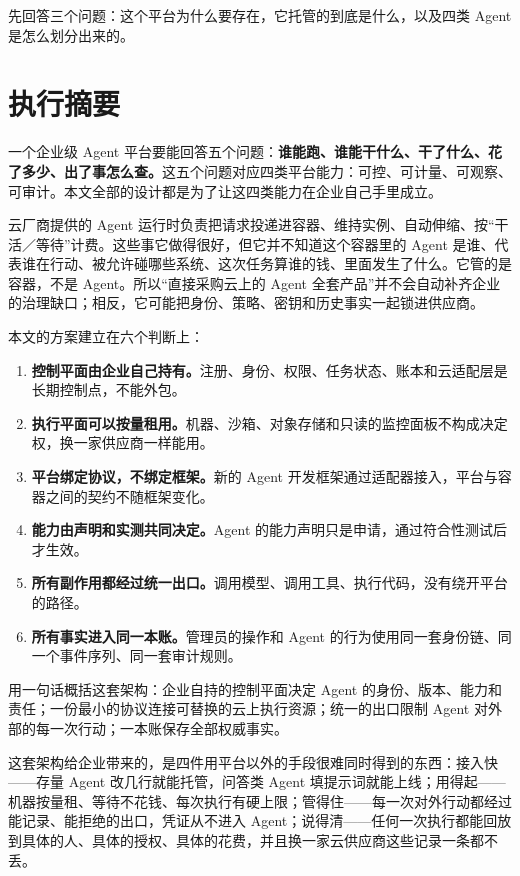 {先回答三个问题：这个平台为什么要存在，它托管的到底是什么，以及四类 Agent 是怎么划分出来的。}

\section{执行摘要}
\label{sec:exec}

一个企业级 Agent 平台要能回答五个问题：\textbf{谁能跑、谁能干什么、干了什么、花了多少、出了事怎么查。}这五个问题对应四类平台能力：可控、可计量、可观察、可审计。本文全部的设计都是为了让这四类能力在企业自己手里成立。

云厂商提供的 Agent 运行时负责把请求投递进容器、维持实例、自动伸缩、按“干活／等待”计费。这些事它做得很好，但它并不知道这个容器里的 Agent 是谁、代表谁在行动、被允许碰哪些系统、这次任务算谁的钱、里面发生了什么。它管的是容器，不是 Agent。所以“直接采购云上的 Agent 全套产品”并不会自动补齐企业的治理缺口；相反，它可能把身份、策略、密钥和历史事实一起锁进供应商。

本文的方案建立在六个判断上：

\begin{enumerate}
  \item \textbf{控制平面由企业自己持有。}注册、身份、权限、任务状态、账本和云适配层是长期控制点，不能外包。
  \item \textbf{执行平面可以按量租用。}机器、沙箱、对象存储和只读的监控面板不构成决定权，换一家供应商一样能用。
  \item \textbf{平台绑定协议，不绑定框架。}新的 Agent 开发框架通过适配器接入，平台与容器之间的契约不随框架变化。
  \item \textbf{能力由声明和实测共同决定。}Agent 的能力声明只是申请，通过符合性测试后才生效。
  \item \textbf{所有副作用都经过统一出口。}调用模型、调用工具、执行代码，没有绕开平台的路径。
  \item \textbf{所有事实进入同一本账。}管理员的操作和 Agent 的行为使用同一套身份链、同一个事件序列、同一套审计规则。
\end{enumerate}

用一句话概括这套架构：企业自持的控制平面决定 Agent 的身份、版本、能力和责任；一份最小的协议连接可替换的云上执行资源；统一的出口限制 Agent 对外部的每一次行动；一本账保存全部权威事实。

这套架构给企业带来的，是四件用平台以外的手段很难同时得到的东西：接入快——存量 Agent 改几行就能托管，问答类 Agent 填提示词就能上线；用得起——机器按量租、等待不花钱、每次执行有硬上限；管得住——每一次对外行动都经过能记录、能拒绝的出口，凭证从不进入 Agent；说得清——任何一次执行都能回放到具体的人、具体的授权、具体的花费，并且换一家云供应商这些记录一条都不丢。

